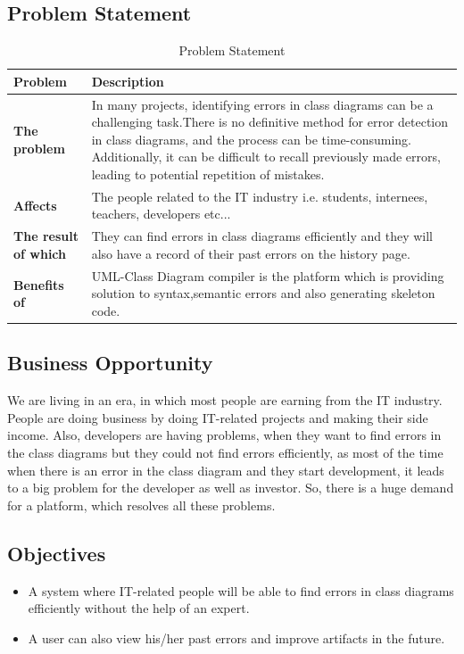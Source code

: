 \documentclass[12pt,a4paper]{article}
\begin{document}
\subsection{Problem Statement}
\begin{table}[h!]
    \centering
    \caption{Problem Statement}
    \begin{tabular}{|l|p{9cm}|}
        \hline
       \textbf{Problem}  &\textbf{Description}  \\ %
       \hline %
        \textbf{The problem} &
        In many projects, identifying errors in class diagrams can be a challenging task.There is no definitive method for error detection in class diagrams, and the process can be time-consuming. Additionally, it can be difficult to recall previously made errors, leading to potential repetition of mistakes.
        \\%
        \hline
        \textbf{Affects} & 
        The people related to the IT industry i.e. students, internees, teachers, developers etc... \\%
        \hline
        \textbf{The result of which}&
            They can find errors in class diagrams efficiently and they will also have a record of their past errors on the history page.
        \\%
         \hline
        \textbf{Benefits of}&
         UML-Class Diagram compiler is the platform which is providing solution to syntax,semantic errors and also generating skeleton code.
        \\%
        \hline
    \end{tabular}
\end{table}

\subsection{Business Opportunity}
We are living in an era, in which most people are earning from the IT industry. People are doing business by doing IT-related projects and making their side income. Also, developers are having problems, when they want to find errors in the class diagrams but they could not find errors efficiently, as most of the time when there is an error in the class diagram and they start development, it leads to a big problem for the developer as well as investor. So, there is a huge demand for a platform, which resolves all these problems.


\subsection{Objectives}
\begin{itemize}
    \item A system where IT-related people will be able to find errors in class diagrams efficiently without the help of an expert.
    \item A user can also view his/her past errors and improve artifacts in the future.
\end{itemize}
\end{document}
